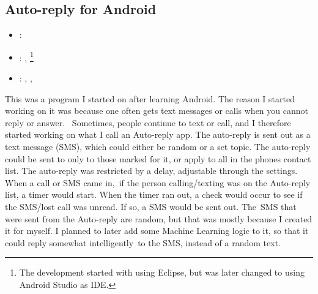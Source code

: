 \subsection{Auto-reply for Android}
\label{sec:auto_reply_android}
\begin{itemize} 
	\item {}: 
	\item {}: , \footnote{
		The development started with using Eclipse, but was later changed to using Android Studio as IDE.
	}
	\item {}: , , 
\end{itemize} 
This was a program I started on after learning Android. 
The reason I started working on it was because one often gets text messages or calls when you cannot reply or answer. 
Sometimes, people continue to text or call, and I therefore started working on what I call an Auto-reply app. 
The auto-reply is sent out as a text message (SMS), which could either be random or a set topic.
\vspace{0.5em}\newline
The auto-reply could be sent to only to those marked for it, or apply to all in the phones contact list. 
The auto-reply was restricted by a delay, adjustable through the settings. 
When a call or SMS came in, if the person calling/texting was on the Auto-reply list, a timer would start. 
When the timer ran out, a check would occur to see if the SMS/lost call was unread. If so, a SMS would be sent out. 
\vspace{0.5em}\newline
The SMS that were sent from the Auto-reply are random, but that was mostly because I created it for myself. 
I planned to later add some Machine Learning logic to it, so that it could reply somewhat intelligently to the SMS, instead of a random text.
\vspace{0.5em}\newline
